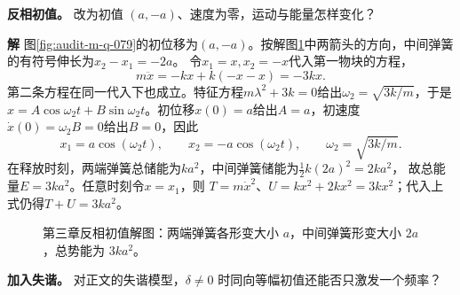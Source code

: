\documentclass[11pt,openany,fontset=fandol]{ctexbook}
\theoremstyle{plain}\newtheorem{theorem}{定理}[chapter]\newtheorem{proposition}[theorem]{命题}
\theoremstyle{definition}\newtheorem{definition}{定义}[chapter]\newtheorem{example}{例}[chapter]
\theoremstyle{remark}\newtheorem*{remark}{说明}
\newcommand{\SolutionStart}{\par\nobreak\medskip\nobreak\noindent\textbf{解}\quad\ignorespaces}
\newenvironment{solution}{\SolutionStart}{\par\medskip}
\begin{document}
\textbf{反相初值。} 改为初值 $(a,-a)$、速度为零，运动与能量怎样变化？


\begin{solution}
图\ref{fig:audit-m-q-079}的初位移为$(a,-a)$。按解图\ref{fig:class-3-2}中两箭头的方向，中间弹簧的有符号伸长为$x_2-x_1=-2a$。
令$x_1=x,x_2=-x$代入第一物块的方程，
\[
 m\ddot x=-kx+k(-x-x)=-3kx.
\]
第二条方程在同一代入下也成立。特征方程$m\lambda^2+3k=0$给出$\omega_2=\sqrt{3k/m}$，于是$x=A\cos\omega_2t+B\sin\omega_2t$。初位移$x(0)=a$给出$A=a$，初速度$\dot x(0)=\omega_2B=0$给出$B=0$，因此
\[
 x_1=a\cos(\omega_2t),\qquad x_2=-a\cos(\omega_2t),
 \qquad\omega_2=\sqrt{3k/m}.
\]
在释放时刻，两端弹簧总储能为$ka^2$，中间弹簧储能为$\tfrac12k(2a)^2=2ka^2$，
故总能量$E=3ka^2$。任意时刻令$x=x_1$，则
$T=m\dot x^2$、$U=kx^2+2kx^2=3kx^2$；代入上式仍得$T+U=3ka^2$。

\begin{figure}[H]\centering
{}
\caption{第三章反相初值解图：两端弹簧各形变大小 $a$，中间弹簧形变大小 $2a$，总势能为 $3ka^2$。}\label{fig:class-3-2}
\end{figure}
\end{solution}

\textbf{加入失谐。} 对正文的失谐模型，$\delta\ne0$ 时同向等幅初值还能否只激发一个频率？
\end{document}
